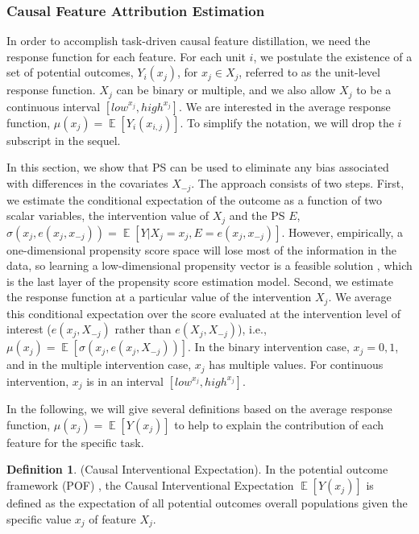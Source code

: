 \documentclass[letterpaper]{article} %
\DeclareMathOperator{\E}{\mathbb{E}}
\theoremstyle{definition}
\newtheorem{definition}{Definition}
\theoremstyle{remark}
\begin{document}
\subsubsection{Causal Feature Attribution Estimation}

In order to accomplish task-driven causal feature distillation, we need the response function for each feature. For each unit $i$, we postulate the existence of a set of potential outcomes, $Y_i(x_j)$, for $x_j \in X_j$, referred to as the unit-level response function. $X_j$ can be binary or multiple, and we also allow $X_j$ to be a continuous interval $[{low}^{x_j}, {high}^{x_j}]$. We are interested in the average response function, $\mu(x_j) = \E[Y_i(x_{i,j})]$. To simplify the notation, we will drop the $i$ subscript in the sequel.

In this section, we show that PS can be used to eliminate any bias associated with differences in the covariates $X_{-j}$. The approach consists of two steps. First, we estimate the conditional expectation of the outcome as a function of two scalar variables, the intervention value of $X_j$ and the PS $E$, $\sigma(x_j, e(x_{j}, x_{-j})) = \E[Y|X_j = x_j, E = e(x_{j}, x_{-j})]$. However, empirically, a one-dimensional propensity score space will lose most of the information in the data, so learning a low-dimensional propensity vector is a feasible solution \cite{chu2020matching}, which is the last layer of the propensity score estimation model. Second, we estimate the response function at a particular value of the intervention $X_j$. We average this conditional expectation over the score evaluated at the intervention level of interest ($e(x_j, X_{-j})$ rather than $e(X_j, X_{-j})$), i.e., $\mu(x_j) = \E[\sigma(x_j, e(x_{j}, X_{-j}))]$. In the binary intervention case, $x_j ={0, 1}$, and in the multiple intervention case, $x_j$ has multiple values. For continuous intervention, $x_j$ is in an interval $[low^{x_j}, high^{x_j}]$. 

In the following, we will give several definitions based on the average response function, $\mu(x_j) = \E[Y(x_j)]$ to help to explain the contribution of each feature for the specific task. 


\theoremstyle{definition}
\begin{definition}({Causal Interventional Expectation}).
In the potential outcome framework (POF) \cite{rosenbaum1983central}, the Causal Interventional Expectation $\E[Y(x_j)]$ is defined as the expectation of all potential outcomes overall populations given the specific value $x_j$ of feature $X_j$.
\label{def: causal importance}
\end{definition}
\end{document}
